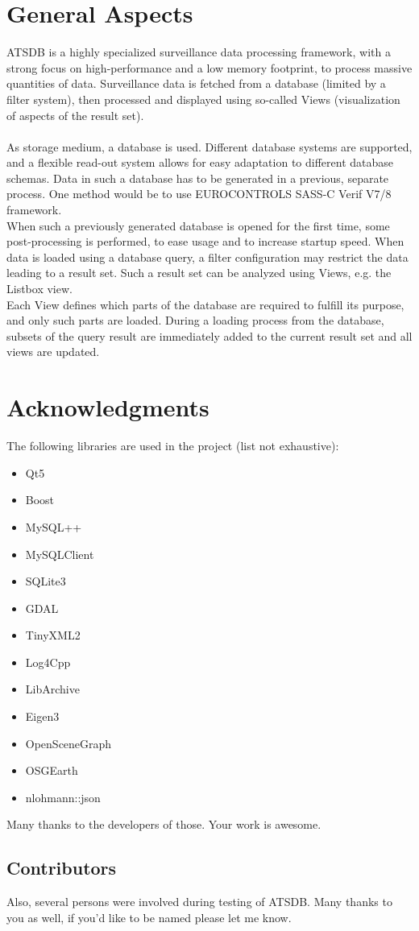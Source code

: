 \section{General Aspects}
ATSDB is a highly specialized surveillance data processing framework, with a strong focus on high-performance and a low memory footprint,  to process massive quantities of data. Surveillance data is fetched from a database (limited by a filter system), then processed and displayed using so-called Views (visualization of aspects of the result set).\\\\

As storage medium, a database is used.  Different database systems are supported, and a flexible read-out system allows for easy adaptation to different database schemas.  Data in such a database has to be generated in a previous, separate process.  One method would be to use EUROCONTROLS SASS-C  Verif V7/8 framework.\\

When such a previously generated database is opened for the first time, some post-processing is performed, to ease usage and to increase startup speed.  When data is loaded using a database query, a filter configuration may restrict the data leading to a result set.  Such a result set can be analyzed using Views, e.g. the Listbox view.\\

Each View defines which parts of the database are required to fulfill its purpose, and only such parts are loaded.  During a loading process from the database, subsets of the query result are immediately added to the current result set and all views are updated. 

\section{Acknowledgments}

The following libraries are used in the project (list not exhaustive):

\begin{itemize}  
\item Qt5
\item Boost
\item MySQL++
\item MySQLClient
\item SQLite3
\item GDAL
\item TinyXML2
\item Log4Cpp
\item LibArchive
\item Eigen3
\item OpenSceneGraph
\item OSGEarth
\item nlohmann::json
\end{itemize}

Many thanks to the developers of those. Your work is awesome.

\subsection{Contributors}

Also, several persons were involved during testing of ATSDB. Many thanks to you as well, if you'd like to be named please let me know.


